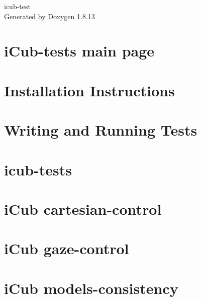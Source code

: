\documentclass[twoside]{book}
\newcommand{\+}{\discretionary{\mbox{\scriptsize$\hookleftarrow$}}{}{}}
\newcommand{\clearemptydoublepage}{%
  \newpage{\pagestyle{empty}\cleardoublepage}%
}
\begin{document}
\begin{titlepage}
\vspace*{7cm}
\begin{center}%
{\Large icub-\/test }\\
\vspace*{1cm}
{\large Generated by Doxygen 1.8.13}\\
\end{center}
\end{titlepage}
\clearemptydoublepage
{}
\tableofcontents
\clearemptydoublepage
{}

\chapter{i\+Cub-\/tests main page}
\label{index}\hypertarget{index}{}
\chapter{Installation Instructions}
\label{installation}

\chapter{Writing and Running Tests}
\label{writing-and-running}

\chapter{icub-\/tests}
\label{md__home_runner_work_icub-tests_icub-tests_gh-pages_README}

\chapter{i\+Cub cartesian-\/control}
\label{md__home_runner_work_icub-tests_icub-tests_gh-pages_src_cartesian-control_README}

\chapter{i\+Cub gaze-\/control}
\label{md__home_runner_work_icub-tests_icub-tests_gh-pages_src_gaze-control_README}

\chapter{i\+Cub models-\/consistency}
\label{md__home_runner_work_icub-tests_icub-tests_gh-pages_src_models-consistency_README}

\end{document}
